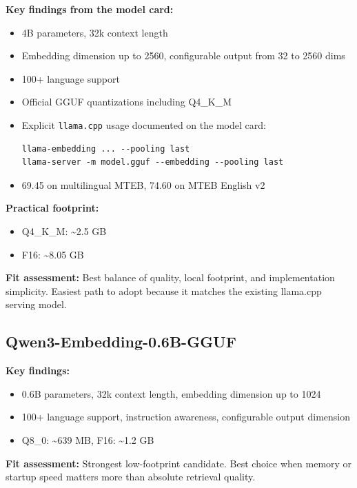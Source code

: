 \textbf{Key findings from the model card:}

\begin{itemize}
    \item 4B parameters, 32k context length
    \item Embedding dimension up to 2560, configurable output from 32 to 2560 dims
    \item 100+ language support
    \item Official GGUF quantizations including Q4\_K\_M
    \item Explicit \texttt{llama.cpp} usage documented on the model card:
\begin{Verbatim}
llama-embedding ... --pooling last
llama-server -m model.gguf --embedding --pooling last
\end{Verbatim}
    \item 69.45 on multilingual MTEB, 74.60 on MTEB English v2
\end{itemize}

\textbf{Practical footprint:}

\begin{itemize}
    \item Q4\_K\_M: \textasciitilde2.5 GB
    \item F16: \textasciitilde8.05 GB
\end{itemize}

\textbf{Fit assessment:} Best balance of quality, local footprint, and implementation
simplicity. Easiest path to adopt because it matches the existing llama.cpp serving model.

\subsection{Qwen3-Embedding-0.6B-GGUF}

\textbf{Key findings:}

\begin{itemize}
    \item 0.6B parameters, 32k context length, embedding dimension up to 1024
    \item 100+ language support, instruction awareness, configurable output dimension
    \item Q8\_0: \textasciitilde639 MB, F16: \textasciitilde1.2 GB
\end{itemize}

\textbf{Fit assessment:} Strongest low-footprint candidate. Best choice when memory or startup
speed matters more than absolute retrieval quality.

